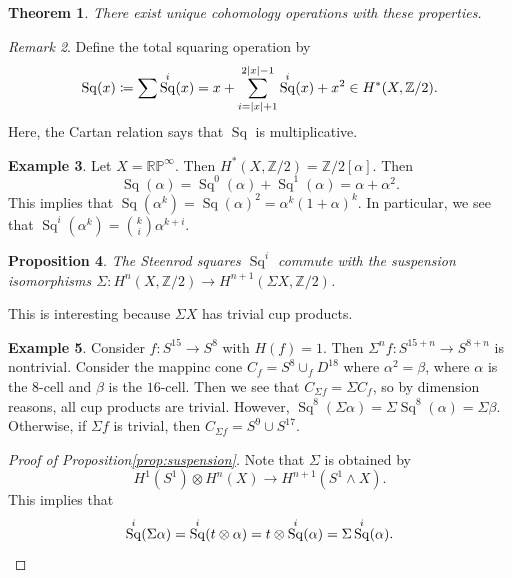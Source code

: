 \documentclass[leqno, openany]{memoir}
\newtheorem{thm}{Theorem}[section]
\newtheorem{prop}[thm]{Proposition}
\theoremstyle{definition}
\newtheorem{exm}[thm]{Example}
\theoremstyle{remark}
\newtheorem{rmk}[thm]{Remark}
\theoremstyle{plain}
\theoremstyle{definition}
\theoremstyle{remark}
\newcommand{\R}{\mathbb{R}}
\newcommand{\Z}{\mathbb{Z}}
\renewcommand{\P}{\mathbb{P}}
\DeclareMathOperator{\Sq}{Sq}
\begin{document}
\begin{thm}\label{thm:steenrodsquare} There exist unique cohomology operations
with these properties.  \end{thm}

\begin{rmk} Define the total squaring operation by \begin{align*} \Sq(x)
\coloneqq \sum \Sq^i(x) = x + \sum_{i = \abs{x}+1}^{2 \abs{x}-1} \Sq^i(x) + x^2
\in H^*(X, \Z/2).  \end{align*} Here, the Cartan relation says that $\Sq$ is
multiplicative.  \end{rmk}

\begin{exm} Let $X = \R\P^{\infty}$. Then $H^*(X, \Z/2) = \Z/2[\alpha]$. Then
    \[ \Sq(\alpha) = \Sq^0(\alpha) + \Sq^1(\alpha) = \alpha + \alpha^2. \] This
    implies that $\Sq(\alpha^k) = {\Sq(\alpha)}^2 = \alpha^k {(1+\alpha)}^k$.
    In particular, we see that $\Sq^i(\alpha^k) = \binom{k}{i} \alpha^{k+i}$.
\end{exm}

\begin{prop}\label{prop:suspension} The Steenrod squares $\Sq^i$ commute with
the suspension isomorphisms $\Sigma \colon H^n(X, \Z/2) \to H^{n+1}(\Sigma X,
\Z/2)$.  \end{prop}

This is interesting because $\Sigma X$ has trivial cup products.

\begin{exm} Consider $f \colon S^{15} \to S^8$ with $H(f) = 1$. Then $\Sigma^n
    f \colon S^{15+n} \to S^{8+n}$ is nontrivial. Consider the mappinc cone
    $C_f = S^8 \cup_f D^{18}$ where $\alpha^2 = \beta$, where $\alpha$ is the
    $8$-cell and $\beta$ is the $16$-cell. Then we see that $C_{\Sigma f} =
    \Sigma C_f$, so by dimension reasons, all cup products are trivial.
    However, $\Sq^8(\Sigma \alpha) = \Sigma \Sq^8(\alpha) = \Sigma \beta$.
    Otherwise, if $\Sigma f$ is trivial, then $C_{\Sigma f} = S^9 \cup S^{17}$.
\end{exm}

\begin{proof}[Proof of Proposition\autoref{prop:suspension}] Note that $\Sigma$
    is obtained by \[ H^1(S^1) \otimes H^n(X) \to H^{n+1}(S^1 \wedge X). \]
    This implies that \[ \Sq^i(\Sigma \alpha) = \Sq^i(t \otimes \alpha) = t
    \otimes \Sq^i(\alpha) = \Sigma \Sq^i(\alpha). \qedhere \] \end{proof}
\end{document}
